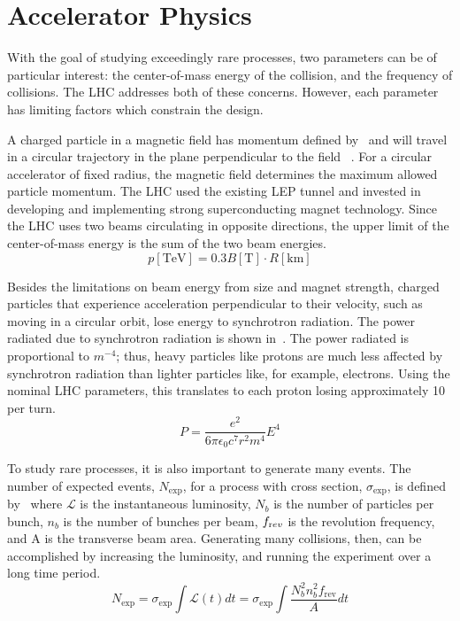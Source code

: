 %
\section{Accelerator Physics}
\label{ch:lhc:acc}
With the goal of studying exceedingly rare processes, two parameters can be of particular interest: the center-of-mass energy of the collision, and the frequency of collisions. The LHC addresses both of these concerns. However, each parameter has limiting factors which constrain the design. 

A charged particle in a magnetic field has momentum defined by~\Eqn{\ref{eqn:mag_field}} and will travel in a circular trajectory in the plane perpendicular to the field~\cite{accelerators} . For a circular accelerator of fixed radius, the magnetic field determines the maximum allowed particle momentum. The LHC used the existing LEP tunnel and invested in developing and implementing strong superconducting magnet technology. Since the LHC uses two beams circulating in opposite directions, the upper limit of the center-of-mass energy is the sum of the two beam energies. 
\begin{equation}
p[\textrm{TeV}] =0.3B[\textrm{T}]\cdot R[\textrm{km}] 
\label{eqn:mag_field}
\end{equation}


Besides the limitations on beam energy from size and magnet strength, charged particles that experience acceleration perpendicular to their velocity, such as moving in a circular orbit, lose energy to synchrotron radiation. The power radiated due to synchrotron radiation is shown in~\Eqn{\ref{eqn:synchrotron_rad}}. The power radiated is proportional to $m^{-4}$; thus, heavy particles like protons are much less affected by synchrotron radiation than lighter particles like, for example, electrons. Using the nominal LHC parameters, this translates to each proton losing approximately 10\,\keV\,per turn. 
\begin{equation}
P = \frac{e^2}{6\pi\epsilon_0c^7r^2m^4}E^4
\label{eqn:synchrotron_rad}
\end{equation}


To study rare processes, it is also important to generate many events. The number of expected events, $N_{\textrm{exp}}$, for a process with cross section, $\sigma_{\textrm{exp}}$, is defined by~\Eqn{\ref{eqn:n_evts}} where $\mathcal{L}$ is the instantaneous luminosity, $N_b$ is the number of particles per bunch, $n_b$ is the number of bunches per beam, $f_{\textrm rev}$ is the revolution frequency, and A is the transverse beam area. Generating many collisions, then, can be accomplished by increasing the luminosity, and running the experiment over a long time period.
\begin{equation}
N_{\textrm{exp}} = \sigma_{\textrm{exp}}\int\mathcal{L}(t)dt = \sigma_{\textrm{exp}}\int \frac{N_b^2n_b^2f_{\textrm{rev}}}{A} dt
\label{eqn:n_evts}
\end{equation}

